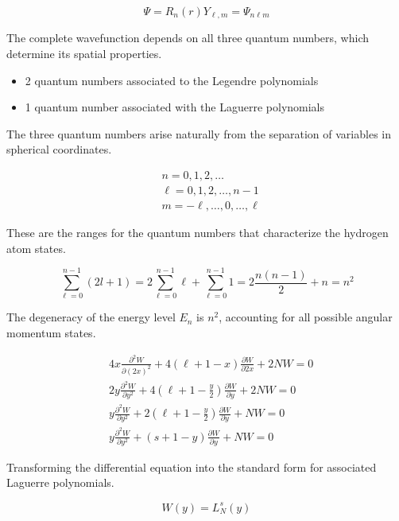\begin{equation}
\Psi=R_{n}(r) Y_{\ell, m}=\Psi_{n \ell m}
\end{equation}

The complete wavefunction depends on all three quantum numbers, which determine its spatial properties.

\begin{itemize}
  \item 2 quantum numbers associated to the Legendre polynomials
  \item 1 quantum number associated with the Laguerre polynomials
\end{itemize}

The three quantum numbers arise naturally from the separation of variables in spherical coordinates.

\begin{align}
& n=0,1,2, \ldots \\
& \ell=0,1,2, \ldots, n-1  \\
& m=-\ell, \ldots, 0, \ldots, \ell
\end{align}

These are the ranges for the quantum numbers that characterize the hydrogen atom states.

\begin{equation}
\sum_{\ell=0}^{n-1}(2 l+1)=2 \sum_{\ell=0}^{n-1} \ell+\sum_{\ell=0}^{n-1} 1=2 \frac{n(n-1)}{2}+n=n^{2}
\end{equation}

The degeneracy of the energy level $E_n$ is $n^2$, accounting for all possible angular momentum states.

\begin{align}
& 4 x \frac{\partial^{2} W}{\partial(2 x)^{2}}+4(\ell+1-x) \frac{\partial W}{\partial 2 x}+2 N W=0 \\
& 2 y \frac{\partial^{2} W}{\partial y^{2}}+4\left(\ell+1-\frac{y}{2}\right) \frac{\partial W}{\partial y}+2 N W=0  \\
& y \frac{\partial^{2} W}{\partial y^{2}}+2\left(\ell+1-\frac{y}{2}\right) \frac{\partial W}{\partial y}+N W=0 \\
& y \frac{\partial^{2} W}{\partial y^{2}}+(s+1-y) \frac{\partial W}{\partial y}+N W=0
\end{align}

Transforming the differential equation into the standard form for associated Laguerre polynomials.

\begin{equation}
W(y)=L_{N}^{s}(y)
\end{equation}

